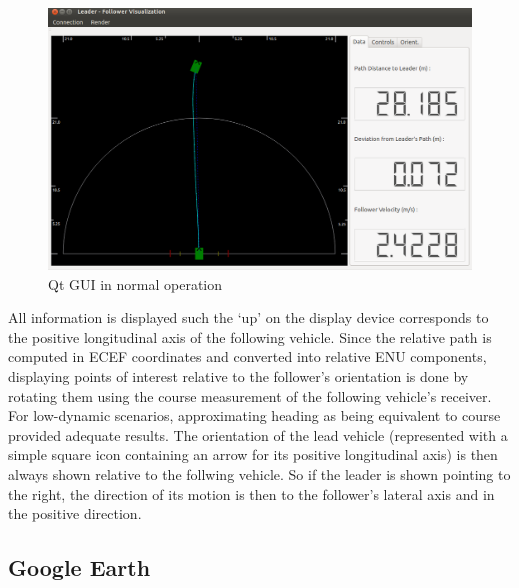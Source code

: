 \documentclass[twocolumn,10pt]{article}
\begin{document}
    \begin{figure}[ht] \centering
      \includegraphics[width=\columnwidth] {../graphics/final_design_data.png}
      \caption{Qt GUI in normal operation}
      \label{fig:qt_normal}
    \end{figure}

    All information is displayed such the `up' on the display device corresponds to the positive longitudinal axis of the following vehicle.
    Since the relative path is computed in ECEF coordinates and converted into relative ENU components, displaying points of interest relative to the follower's orientation is done by rotating them using the course measurement of the following vehicle's receiver. For low-dynamic scenarios, approximating heading as being equivalent to course provided adequate results.
    The orientation of the lead vehicle (represented with a simple square icon containing an arrow for its positive longitudinal axis) is then always shown relative to the follwing vehicle.  So if the leader is shown pointing to the right, the direction of its motion is then to the follower’s lateral axis and in the positive direction. 


  \subsection*{Google Earth}
\end{document}
